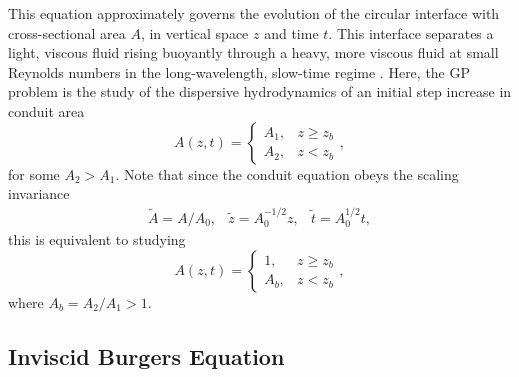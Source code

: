 \documentclass{jfm}
\begin{document}
\noindent
This equation approximately governs the evolution of the circular
interface with cross-sectional area $A$, in vertical space $z$ and time $t$. This interface separates a light, viscous
fluid rising buoyantly through a heavy, more viscous fluid
at small Reynolds numbers in the long-wavelength, slow-time regime \cite{scott_observations_1986,lowman_dispersive_2013}.
Here, the GP problem is the study of the dispersive hydrodynamics of an initial step increase in conduit area
\begin{equation}\label{eq:GP}
    A(z,t) = \begin{cases}
                A_1, & z\geq z_b \\
                A_2, & z<z_b
             \end{cases},
\end{equation}
for some $A_2>A_1$.
Note that since the conduit equation obeys the scaling invariance
\begin{equation}\label{eq:scaling1}
  \begin{array}{ccc}
    \tilde{A}=A/A_0, & \tilde{z}=A_0^{-1/2}z,  & \tilde{t} = A_0^{1/2}t,
  \end{array}
\end{equation}
this is equivalent to studying
\begin{equation}\label{eq:GPscaled}
    A(z,t) = \begin{cases}
                1,   & z\geq z_b \\
                A_b, & z<z_b
             \end{cases},
\end{equation}
where $A_b = A_2/A_1 > 1$.

\subsection{Inviscid Burgers Equation}\label{sec:Inv-Bur-EQ}

\end{document}
